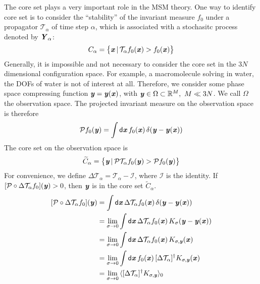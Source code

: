 \documentclass[aip,jcp,a4paper,reprint,onecolumn]{revtex4-1}
\newcommand{\vect}[1]{\textbf{\textit{#1}}}
\newcommand{\dd}{\textsf{d}}
\newcommand{\mt}{\mathcal T}
\begin{document}
The core set plays a very important role in the MSM theory. One way to
identify core set is to consider the ``stability'' of the invariant
measure $f_0$ under a propagator $\mt_\alpha$
of time step $\alpha$, which is associated with a
stochasitc process denoted by $\vect Y_\alpha$:
\begin{align}
  C_\alpha = \big\{
  \vect x \,\vert\, \mt_\alpha f_0(\vect x) > f_0(\vect x)
  \big\}
\end{align}
Generally, it is impossible and not necessary to consider the core set
in the $3N$ dimensional configuration space. For example, a
macromolecule solving in water, the DOFs of water is not of interest
at all. Therefore, we consider some phase space compressing function
$\vect y = \vect y(\vect x)$, with $\vect y \in \Omega \subset \mathbb
R^M,\ M\ll 3N$. We call $\Omega$ the observation space.  The projected
invariant measure on the observation space is therefore
\begin{align}
  \mathcal P f_0 (\vect y)
  =
  \int
  \dd \vect x\,
  f_0(\vect x) \,
  \delta (\vect y - \vect y(\vect x)) 
\end{align}
The core set on the observation space is
\begin{align}
  \widetilde
  C_\alpha = \big\{
  \vect y \,\vert\,
  \mathcal P\mt_\alpha f_0(\vect y) > \mathcal P f_0(\vect y)
  \big\}
\end{align}
For convenience, we define $\Delta \mt_\alpha =
\mt_\alpha - \mathcal I$, where $\mathcal I$ is the
identity. If $[\mathcal P\circ\Delta \mt_\alpha f_0](\vect y) > 0$, then
$\vect y$ is in the core set $\widetilde C_\alpha $.
\begin{align}\nonumber
  [\mathcal P\circ\Delta \mt_\alpha f_0](\vect y)
  &=
  \int
  \dd \vect x\,
  \Delta \mt_\alpha f_0(\vect x) \,
  \delta (\vect y - \vect y(\vect x))  \\\nonumber
  &=
  \lim_{\sigma \rightarrow 0}
  \int
  \dd \vect x\,
  \Delta \mt_\alpha f_0(\vect x) \,
  K_{\sigma} (\vect y - \vect y(\vect x))  \\\nonumber
  &=
  \lim_{\sigma \rightarrow 0}
  \int
  \dd \vect x\,
  \Delta \mt_\alpha f_0(\vect x) \,
  K_{\sigma, \vect y} (\vect x)  \\\nonumber
  &=
  \lim_{\sigma \rightarrow 0}
  \int
  \dd \vect x\,
  f_0(\vect x) \,
  [\Delta \mt_\alpha]^\dagger K_{\sigma, \vect y} (\vect x)\\
  &=
  \lim_{\sigma \rightarrow 0}\,
  \langle
  [\Delta \mt_\alpha]^\dagger K_{\sigma, \vect y}
  \rangle_0
\end{align}
\end{document}
